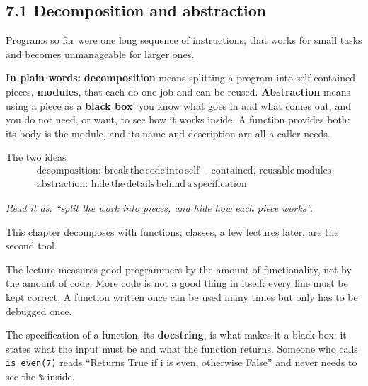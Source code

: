 \documentclass[11pt]{article}
\begin{document}
\begin{keepsection}
\section{7.1 Decomposition and abstraction}

Programs so far were one long sequence of instructions; that works for small tasks and becomes unmanageable for larger ones.

\begin{plainbox}\textbf{In plain words:} \textbf{decomposition} means splitting a program into self-contained pieces, \textbf{modules}, that each do one job and can be reused. \textbf{Abstraction} means using a piece as a \textbf{black box}: you know what goes in and what comes out, and you do not need, or want, to see how it works inside. A function provides both: its body is the module, and its name and description are all a caller needs.\end{plainbox}

\begin{equationcard}{The two ideas}
\[ \begin{gathered} \text{decomposition}:\, \text{break}\, \text{the}\, \text{code}\, \text{into}\, \text{self}-\text{contained},\, \text{reusable}\, \text{modules} \\ \text{abstraction}:\, \text{hide}\, \text{the}\, \text{details}\, \text{behind}\, \mathrm{a}\, \text{specification} \end{gathered} \]
{\small \emph{Read it as: “split the work into pieces, and hide how each piece works”.}\par  This chapter decomposes with functions; classes, a few lectures later, are the second tool.}
\end{equationcard}

The lecture measures good programmers by the amount of functionality, not by the amount of code. More code is not a good thing in itself: every line must be kept correct. A function written once can be used many times but only has to be debugged once.

The specification of a function, its \textbf{docstring}, is what makes it a black box: it states what the input must be and what the function returns. Someone who calls \texttt{is\_even(7)} reads “Returns True if i is even, otherwise False” and never needs to see the \texttt{\%} inside.


\end{keepsection}
\end{document}
